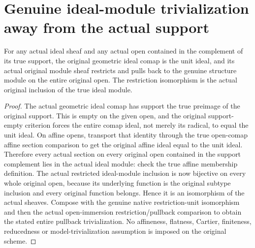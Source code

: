 \section{Genuine ideal-module trivialization away from the actual support}

\begin{lemma}
\label{lem:actual-ideal-module-off-support}
\leanok
For any actual ideal sheaf and any actual open contained in the complement
of its true support, the original geometric ideal comap is the unit ideal,
and its actual original module sheaf restricts and pulls back to the genuine
structure module on the entire original open. The restriction isomorphism
is the actual original inclusion of the true ideal module.
\end{lemma}
\begin{proof}
The actual geometric ideal comap has support the true preimage of the
original support. This is empty on the given open, and the original
support-empty criterion forces the entire comap ideal, not merely its
radical, to equal the unit ideal. On affine opens, transport that
identity through the true open-comap affine section comparison to get
the original affine ideal equal to the unit ideal. Therefore every actual
section on every original open contained in the support complement lies
in the actual ideal module: check the true affine membership definition.
The actual restricted ideal-module inclusion is now bijective on every
whole original open, because its underlying function is the original
subtype inclusion and every original function belongs. Hence it is an
isomorphism of the actual sheaves. Compose with the genuine native
restriction-unit isomorphism and then the actual open-immersion
restriction/pullback comparison to obtain the stated entire pullback
trivialization. No affineness, flatness, Cartier, finiteness, reducedness
or model-trivialization assumption is imposed on the original scheme.
\end{proof}
